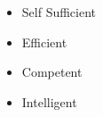 %
%
%

\twocolumnsection
{
\vspace{-0.8em}
\begin{skills}
\end{skills}}
{
\vspace{0.5em}
\begin{itemize}
	\item Self Sufficient            
    \item Efficient
	\item Competent
    \item Intelligent
\end{itemize}
}
